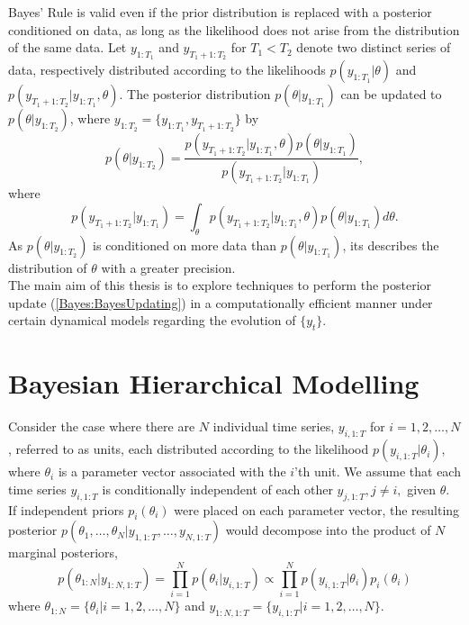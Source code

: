 \documentclass[
12pt, %
onehalfspacing, %
nohyperref, %
headsepline, %
chapterinoneline, %
]{MastersDoctoralThesis} %
\begin{document}
Bayes' Rule is valid even if the prior distribution is replaced with a posterior conditioned on data, as long as the likelihood does not arise from the distribution of the same data. Let $y_{1:T_1}$ and $y_{T_1 + 1:T_2}$ for $T_1 < T_2$ denote two distinct series of data, respectively distributed according to the likelihoods $p(y_{1:T_1} | \theta)$ and $p(y_{T_1+1:T_2} |  y_{1:T_1}, \theta)$. The posterior distribution $p(\theta | y_{1:T_1})$ can be updated to $p(\theta | y_{1:T_2})$, where $y_{1:T_2} = \{y_{1:T_1}, y_{T_1+1:T_2}\}$ by
\begin{equation}
\label{Bayes:BayesUpdating}
p(\theta | y_{1:T_2}) = \frac{p(y_{T_1+1:T_2} | y_{1:T_1}, \theta) p(\theta | y_{1:T_1})}{p(y_{T_1+1:T_2} | y_{1:T_1})},
\end{equation}
where
\begin{equation}
\label{Bayes:UpdateDenominator}
p(y_{T_1+1:T_2} | y_{1:T_1}) = \int_{\theta} p(y_{T_1+1:T_2} | y_{1:T_1}, \theta) p(\theta | y_{1:T_1}) d\theta.
\end{equation}
As  $p(\theta | y_{1:T_2})$ is conditioned on more data than  $p(\theta | y_{1:T_1})$, its describes the distribution of $\theta$ with a greater precision.
\\

The main aim of this thesis is to explore techniques to perform the posterior update (\ref{Bayes:BayesUpdating}) in a computationally efficient manner under certain dynamical models regarding the evolution of $\{y_t\}$.

\section{Bayesian Hierarchical Modelling}
\label{sec:BayesHier}

Consider the case where there are $N$ individual time series, $y_{i, 1:T}$ for $i = 1, 2, \ldots, N$, referred to as units, each distributed according to the likelihood $p(y_{i, 1:T} | \theta_i)$, where $\theta_i$ is a parameter vector associated with the $i$'th unit. We assume that each time series $y_{i, 1:T}$ is conditionally independent of each other $y_{j, 1:T}, j \neq i,$ given $\theta$. If independent priors $p_i(\theta_i)$ were placed on each parameter vector, the resulting posterior $p(\theta_1, \ldots, \theta_N | y_{1, 1:T}, \ldots, y_{N, 1:T})$ would decompose into the product of $N$ marginal posteriors,
\begin{equation}
\label{Hier:Independent}
p(\theta_{1:N} | y_{1:N, 1:T}) = \prod_{i=1}^N p(\theta_i | y_{i, 1:T}) \propto \prod_{i=1}^N p(y_{i, 1:T} | \theta_i) p_i(\theta_i)
\end{equation}
where $\theta_{1:N} = \{\theta_i | i = 1, 2, \ldots, N\}$ and $y_{1:N, 1:T} = \{y_{i, 1:T} | i = 1, 2, \ldots, N \}$.
\\
\end{document}
